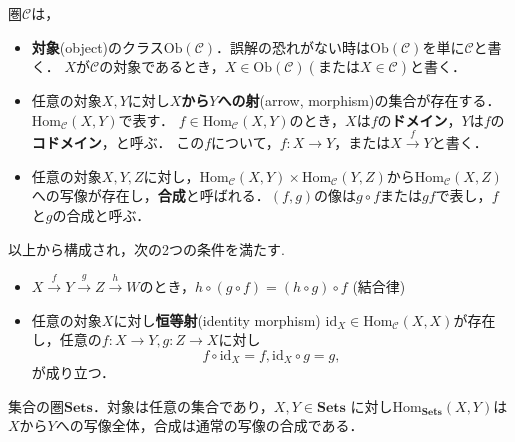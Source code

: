 
\begin{defi}
圏$\mathcal{C}$は，
\begin{itemize}

\item 
{\bf 対象}(object)のクラス$\mathrm{Ob}(\mathcal{C})$．誤解の恐れがない時は$\mathrm{Ob}(\mathcal{C})$を単に$\mathcal{C}$と書く．
$X$が$\mathcal{C}$の対象であるとき，$X \in \mathrm{Ob}(\mathcal{C}) (または X \in \mathcal{C})$と書く．

\item 
任意の対象$X,Y$に対し{\bf $X$から$Y$への射}(arrow, morphism)の集合が存在する．
$\mathrm{Hom}_\mathcal{C}(X,Y)$で表す．
$f \in \mathrm{Hom}_\mathcal{C}(X,Y)$のとき，$X$は$f$の{\bf ドメイン}，$Y$は$f$の{\bf コドメイン}，と呼ぶ．
この$f$について，$f:X \to Y$，または$X \xrightarrow{f} Y$と書く．

\item 
任意の対象$X,Y,Z$に対し，$\mathrm{Hom}_\mathcal{C}(X,Y) \times \mathrm{Hom}_\mathcal{C}(Y,Z)$から$\mathrm{Hom}_\mathcal{C}(X,Z)$への写像が存在し，{\bf 合成}と呼ばれる．$(f,g)$の像は$g \circ f$または$gf$で表し，$f$と$g$の合成と呼ぶ．

\end{itemize}
以上から構成され，次の2つの条件を満たす.
\begin{itemize}
\item
$X \xrightarrow{f} Y \xrightarrow{g} Z \xrightarrow{h} W$のとき，$h \circ (g \circ f) = (h \circ g) \circ f$ (結合律)
\item
任意の対象$X$に対し{\bf 恒等射}(identity morphism) $\mathrm{id}_X \in \mathrm{Hom}_\mathcal{C}(X,X)$が存在し，任意の$f:X \to Y , g:Z \to X$に対し
\[
	f \circ \mathrm{id}_X = f, 	\mathrm{id}_X \circ g = g,
\]
が成り立つ．
\end{itemize}
\end{defi} \proofend


\begin{ex}
集合の圏$\mathbf{Sets}$．対象は任意の集合であり，$X,Y \in \mathbf{Sets}$ に対し$\mathrm{Hom}_\mathbf{Sets}(X,Y)$は$X$から$Y$への写像全体，合成は通常の写像の合成である．
\end{ex} \proofend

